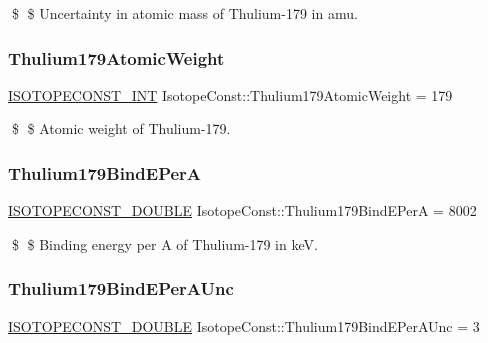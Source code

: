 \$ \$ Uncertainty in atomic mass of Thulium-\/179 in amu. \mbox{\label{group___isotope_const-_thulium-_tm179_ga67238a294d910f40c7d6e5e04d511dc6}} 
\subsubsection{\texorpdfstring{Thulium179\+Atomic\+Weight}{Thulium179AtomicWeight}}
{\footnotesize\ttfamily \mbox{\hyperlink{group___isotope_const-_macros_ga5f18360b3e99483a35c32d789e62621c}{I\+S\+O\+T\+O\+P\+E\+C\+O\+N\+S\+T\+\_\+\+I\+NT}} Isotope\+Const\+::\+Thulium179\+Atomic\+Weight = 179}

\$ \$ Atomic weight of Thulium-\/179. \mbox{\label{group___isotope_const-_thulium-_tm179_ga8a939ef19dc99bb3a862e6ecd74f0fd5}} 
\subsubsection{\texorpdfstring{Thulium179\+Bind\+E\+PerA}{Thulium179BindEPerA}}
{\footnotesize\ttfamily \mbox{\hyperlink{group___isotope_const-_macros_ga8f45a7272ce02c0b4c65c44636ed719a}{I\+S\+O\+T\+O\+P\+E\+C\+O\+N\+S\+T\+\_\+\+D\+O\+U\+B\+LE}} Isotope\+Const\+::\+Thulium179\+Bind\+E\+PerA = 8002}

\$ \$ Binding energy per A of Thulium-\/179 in keV. \mbox{\label{group___isotope_const-_thulium-_tm179_gac22641ec85462804e17ba64eaf4ad028}} 
\subsubsection{\texorpdfstring{Thulium179\+Bind\+E\+Per\+A\+Unc}{Thulium179BindEPerAUnc}}
{\footnotesize\ttfamily \mbox{\hyperlink{group___isotope_const-_macros_ga8f45a7272ce02c0b4c65c44636ed719a}{I\+S\+O\+T\+O\+P\+E\+C\+O\+N\+S\+T\+\_\+\+D\+O\+U\+B\+LE}} Isotope\+Const\+::\+Thulium179\+Bind\+E\+Per\+A\+Unc = 3}

